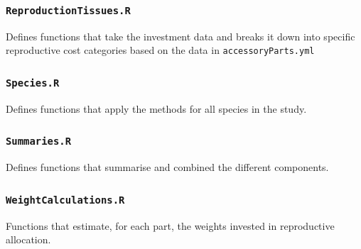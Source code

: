 \documentclass[10pt,twoside]{article}\usepackage[]{graphicx}\usepackage[]{color}
\begin{document}
\subsubsection{\texttt{ReproductionTissues.R}}

Defines functions that take the investment data and breaks it down into specific reproductive cost categories based on the data in \texttt{accessoryParts.yml}


\subsubsection{\texttt{Species.R}}

Defines functions that apply the methods for all species in the study.


\subsubsection{\texttt{Summaries.R}}

Defines functions that summarise and combined the different components.

\subsubsection{\texttt{WeightCalculations.R}}

Functions that estimate, for each part, the weights invested in reproductive allocation.
\end{document}
